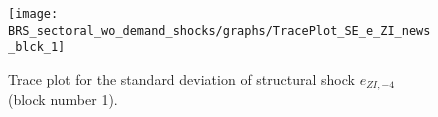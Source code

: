 \begin{figure}[H]
\centering
  \texttt{[image: BRS\_sectoral\_wo\_demand\_shocks/graphs/TracePlot\_SE\_e\_ZI\_news\_blck\_1]}\\
    \caption{Trace plot for the standard deviation of structural shock ${e_{ZI,-4}}$ (block number 1).}
\end{figure}
